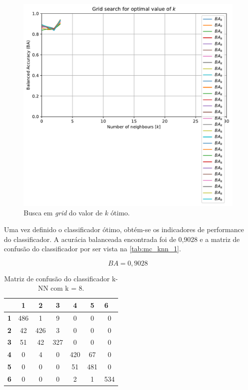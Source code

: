 \begin{figure}[H]
	\centering
	\includegraphics[width=0.75\linewidth]{../../plot/knn_1/grid_search}
	\caption{Busca em \textit{grid} do valor de $k$ ótimo.}
	\label{fig:gridsearch}
\end{figure}

Uma vez definido o classificador ótimo, obtém-se os indicadores de performance do classificador. A acurácia balanceada encontrada foi de 0,9028 e a matriz de confusão do classificador por ser vista na \autoref{tab:mc_knn_1}.

\begin{equation}\label{eq:ba_knn_1}
	BA = 0,9028
\end{equation}

\begin{table}[H]
	\centering
	\begin{tabular}{c||c|c|c|c|c|c|}
		\cline{2-7}
		& \textbf{1} & \textbf{2} & \textbf{3} & \textbf{4} & \textbf{5} & \multicolumn{1}{l|}{\textbf{6}} \\ \hline \hline
		\multicolumn{1}{|c||}{\textbf{1}} & 486        & 1          & 9          & 0          & 0          & 0                               \\ \hline
		\multicolumn{1}{|c||}{\textbf{2}} & 42         & 426        & 3          & 0          & 0          & 0                               \\ \hline
		\multicolumn{1}{|c||}{\textbf{3}} & 51         & 42         & 327        & 0          & 0          & 0                               \\ \hline
		\multicolumn{1}{|c||}{\textbf{4}} & 0          & 4          & 0          & 420        & 67         & 0                               \\ \hline
		\multicolumn{1}{|c||}{\textbf{5}} & 0          & 0          & 0          & 51         & 481        & 0                               \\ \hline
		\multicolumn{1}{|c||}{\textbf{6}} & 0          & 0          & 0          & 2          & 1          & 534                             \\ \hline
	\end{tabular}
	\caption{Matriz de confusão do classificador k-NN com k = 8.}
	\label{tab:mc_knn_1}
\end{table}

